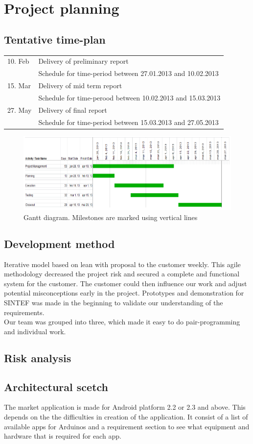\section{Project planning}
\subsection{Tentative time-plan}
	\begin{tabular}{ll}
	10. Feb & Delivery of preliminary report\\
	 & Schedule for time-period between 27.01.2013 and 10.02.2013\\
	15. Mar & Delivery of mid term report\\
	  & Schedule for time-perood between 10.02.2013 and 15.03.2013\\
	27. May & Delivery of final report\\
	 & Schedule for time-period between 15.03.2013 and 27.05.2013\\  
\end{tabular}
\begin{figure}[H]
\includegraphics[scale=0.8]{images/gantt-diagram.png}
\caption{Gantt diagram. Milestones are marked using vertical lines}
\end{figure}
\subsection{Development method}
Iterative model based on lean with proposal to the customer weekly. This agile methodology decreased the project risk and secured a complete and functional system for the customer. The customer could then influence our work and adjust potential misconceptions early in the project. Prototypes and demonstration for SINTEF was made in the beginning to validate our understanding of the requirements.\\
\newline
Our team was grouped into three, which made it easy to do pair-programming and individual work.
\subsection{Risk analysis}

\subsection{Architectural scetch}
The market application is made for Android platform 2.2 or 2.3 and above. This depends on the the difficulties in creation of the application. It consist of a list of available apps for Arduinos and a requirement section to see what equipment and hardware that is required for each app.
